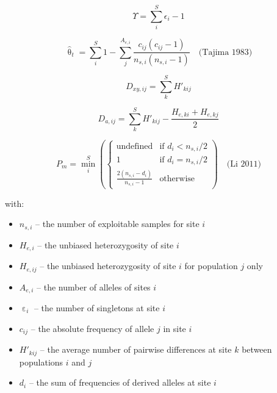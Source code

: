 \documentclass{scrartcl}
\begin{document}
\begin{displaymath}
    \Upsilon = \sum_i^S \epsilon_i - 1
\end{displaymath}

\begin{displaymath}
    \hat{\uptheta}_t = \sum_i^S 1 - \sum_j^{A_{e,i}} \frac{c_{ij} (c_{ij}-1)} {n_{s,i}(n_{s,i}-1)} \quad \mbox{(Tajima 1983)}
\end{displaymath}

\begin{displaymath}
    D_{xy,ij} = \sum_k^S H'_{kij}
\end{displaymath}

\begin{displaymath}
    D_{a,ij} = \sum_k^S H'_{kij} - \frac{H_{e,ki}+H_{e,kj}}{2}
\end{displaymath}

\begin{displaymath}
    P_m = \min_i^S \left (\begin{cases}
        \mbox{undefined}        &  \mbox{if } d_i < n_{s,i} / 2 \\
        1                       &  \mbox{if } d_i = n_{s,i} / 2 \\
        \frac{2(n_{s,i} - d_i)}{n_{s,i}-1}  &  \mbox{otherwise}
    \end{cases} \right) \quad \mbox{(Li 2011)}
\end{displaymath}

with:

\begin{itemize}
    \item[] $n_{s,i}$ -- the number of exploitable samples for site $i$
    \item[] $H_{e,i}$ -- the unbiased heterozygosity of site $i$
    \item[] $H_{e,ij}$ -- the unbiased heterozygosity of site $i$ for population $j$ only
    \item[] $A_{e,i}$ -- the number of alleles of sites $i$
    \item[] $\upepsilon_i$ -- the number of singletons at site $i$
    \item[] $c_{ij}$ -- the absolute frequency of allele $j$ in site $i$
    \item[] $H'_{kij}$ -- the average number of pairwise differences at site $k$ between populations $i$ and $j$
    \item[] $d_i$ -- the sum of frequencies of derived alleles at site $i$
\end{itemize}
\end{document}
